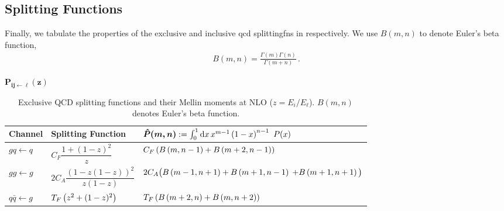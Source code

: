\begin{subappendices}
\begin{subequations}
\end{subequations}


\subsection{Splitting Functions}

Finally, we tabulate the properties of the exclusive and inclusive \gls{qcd} \glspl{splittingfn} in  respectively.
%
We use \(B(m,n)\) to denote Euler's beta function,
\begin{align}
    B(m,n) = \frac{\Gamma(m)\Gamma(n)}{\Gamma(m+n)}
    \,.
\end{align}

%


\begin{table}[h!]
\begin{center}
\LARGE $\boldsymbol{P_{ij \leftarrow \ell}(z)}$
\end{center}
\vspace{-10pt}
\centering
\caption[Exclusive NLO QCD splitting functions and their Mellin moments.]{
    Exclusive QCD splitting functions and their Mellin moments at NLO (\(z = E_i/E_\ell\)).
    $B(m,n)$ denotes Euler's beta function.  
}
\label{tab:exclusive-splitting}
\vspace{5pt}
\renewcommand{\arraystretch}{3.2}
\begin{tabular}{|>{\bfseries}m{2cm}|m{4cm}|m{7cm}|}
\hline
\centering \textbf{Channel} & \centering \textbf{Splitting Function} &
\centering $\boldsymbol{\hat{P}(m,n)} := \int_0^1 \dd x
\, x^{m-1} \left(1-x\right)^{n-1} \, \, P(x)$
\tabularnewline
\hline
\centering $gq \leftarrow q$
                            &
\centering $C_F \dfrac{1 + (1 - z)^2}{z}$
                            &
\centering
$C_F \left(B\left(m,n-1\right) + B\left(m+2,n-1\right)\right)$
\tabularnewline
\hline
\centering
$gg \leftarrow g$
                            &
\centering $2 C_A \dfrac{(1 - z(1 - z))^2}{z(1 - z)}$
                            &
\centering
$2 C_A \big(B\left(m-1, n+1\right) + B\left(m+1, n-1\right)$
\centering
$+ B\left(m+1, n+1\right)\big)$
\tabularnewline
\hline
\centering $q\bar{q} \leftarrow g$
                            &
\centering $T_F \left(z^2 + (1-z)^2\right)$
                            &
\centering
$T_F \left(B\left(m+2, n\right) + B\left(m, n+2\right)\right)$
\tabularnewline
\hline
\end{tabular}
\end{table}





\end{subappendices}
